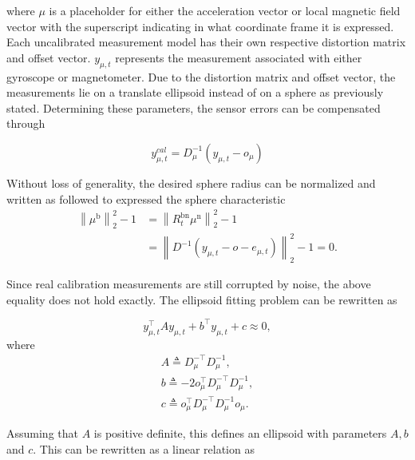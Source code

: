 where $\mu$ is a placeholder for either the acceleration vector or local magnetic field vector with the superscript indicating in what coordinate frame it is expressed. Each uncalibrated measurement model has their own respective distortion matrix and offset vector. $y_{\mu, t}$ represents the measurement associated with either gyroscope or magnetometer.
Due to the distortion matrix and offset vector, the measurements lie on a translate ellipsoid instead of on a sphere as previously stated. Determining these parameters, the sensor errors can be compensated through

\begin{equation}
	y_{\mu, t}^{cal}=D_\mu^{-1}\left(y_{\mu, t}-o_{\mu}\right)
\end{equation}

Without loss of generality, the desired sphere radius can be normalized and written as followed to expressed the sphere characteristic
\begin{equation}
	\begin{aligned}
		\left\|\mu^{\mathrm{b}}\right\|_{2}^{2}-1 &=\left\|R_{t}^{\mathrm{bn}} \mu^{\mathrm{n}}\right\|_{2}^{2}-1 \\
		&=\left\|D^{-1}\left(y_{\mu, t}-o-e_{\mu, t}\right)\right\|_{2}^{2}-1=0.
	\end{aligned}
\end{equation}

Since real calibration measurements are still corrupted by noise, the above equality does not hold exactly. The ellipsoid fitting problem can be rewritten as

\begin{equation}
	\label{eq:calib_elipsoid}
	y_{\mu, t}^{\top} A y_{\mu, t}+b^{\top} y_{\mu, t}+c \approx 0,
\end{equation}
where
\begin{subequations}
	\label{eq:calib_elipsoid_components}
	\begin{align}
		A \triangleq D_\mu^{-\top} D_\mu^{-1}, \\
		b \triangleq-2 o_\mu^{\top} D_\mu^{-\top} D_\mu^{-1}, \\
		c \triangleq o_\mu^{\top} D_\mu^{-\top} D_\mu^{-1} o_\mu.
	\end{align}
\end{subequations}

Assuming that $A$ is positive definite, this defines an ellipsoid with parameters $A, b$ and $c$. This can be rewritten as a linear relation as

